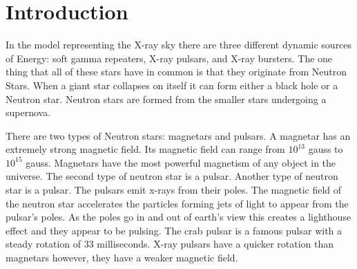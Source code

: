 \documentclass[final,8p,times,twocolumn,authoryear]{elsarticle}
\begin{document}
\begin{frontmatter}







\end{frontmatter}




\section{Introduction}
\label{introduction}
In the model representing the X-ray sky there are three different dynamic sources of Energy: soft gamma repeaters, X-ray pulsars, and X-ray bursters. The one thing that all of these stars have in common is that they originate from Neutron Stars. When a giant star collapses on itself it can form either a black hole or a Neutron star. Neutron stars are formed from the smaller stars undergoing a supernova. 

There are two types of Neutron stars: magnetars and pulsars. A magnetar has an extremely strong magnetic field. Its magnetic field can range from $10^{13}$ gauss to $10^{15}$ gauss. Magnetars have the most powerful magnetism of any object in the universe. The second type of neutron star is a pulsar. Another type of neutron star is a pulsar. The pulsars emit x-rays from their poles. The magnetic field of the neutron star accelerates the particles forming jets of light to appear from the pulsar's poles. As the poles go in and out of earth's view this creates a lighthouse effect and they appear to be pulsing. The crab pulsar is a famous pulsar with a steady rotation of 33 milliseconds. X-ray pulsars have a quicker rotation than magnetars however, they have a weaker magnetic field. 
\end{document}
